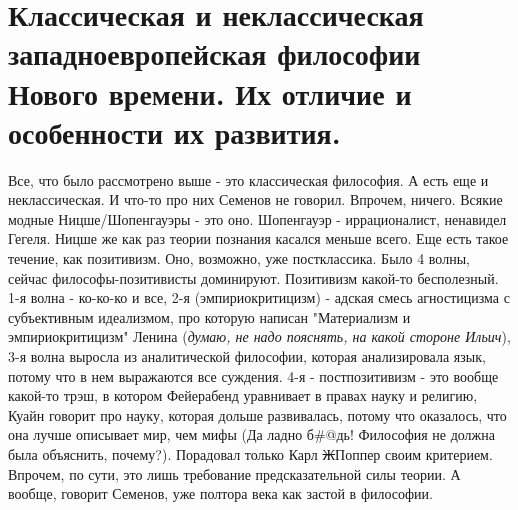\section{Классическая и неклассическая западноевропейская философии Нового времени. Их отличие и особенности их развития.}
Все, что было рассмотрено выше - это классическая философия. А есть еще и неклассическая. И что-то про них Семенов не говорил. Впрочем, ничего. Всякие модные Ницше/Шопенгауэры - это оно. Шопенгауэр - иррационалист, ненавидел Гегеля. Ницше же как раз теории познания касался меньше всего. Еще есть такое течение, как позитивизм. Оно, возможно, уже постклассика. Было 4 волны, сейчас философы-позитивисты доминируют. Позитивизм какой-то бесполезный. 1-я волна - ко-ко-ко и все, 2-я (эмпириокритицизм) - адская смесь агностицизма с субъективным идеализмом, про которую написан "Материализм и эмпириокритицизм" Ленина (\textit{думаю, не надо пояснять, на какой стороне Ильич}), 3-я волна выросла из аналитической философии, которая анализировала язык, потому что в нем выражаются все суждения. 4-я - постпозитивизм - это вообще какой-то трэш, в котором Фейерабенд уравнивает в правах науку и религию, Куайн говорит про науку, которая дольше развивалась, потому что оказалось, что она лучше описывает мир, чем мифы (Да ладно б\#@дь! Философия не должна была объяснить, почему?). Порадовал только Карл \sout{Ж}Поппер своим критерием. Впрочем, по сути, это лишь требование предсказательной силы теории. А вообще, говорит Семенов, уже полтора века как застой в философии.


